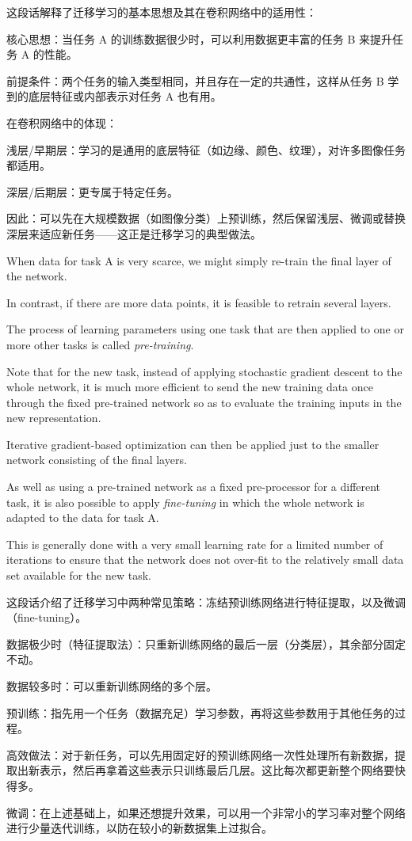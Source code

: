 \documentclass{article}
\begin{document}
{\color{red}
这段话解释了迁移学习的基本思想及其在卷积网络中的适用性：

核心思想：当任务 A 的训练数据很少时，可以利用数据更丰富的任务 B 来提升任务 A 的性能。

前提条件：两个任务的输入类型相同，并且存在一定的共通性，这样从任务 B 学到的底层特征或内部表示对任务 A 也有用。

在卷积网络中的体现：

浅层/早期层：学习的是通用的底层特征（如边缘、颜色、纹理），对许多图像任务都适用。

深层/后期层：更专属于特定任务。

因此：可以先在大规模数据（如图像分类）上预训练，然后保留浅层、微调或替换深层来适应新任务——这正是迁移学习的典型做法。
}

When data for task A is very scarce, we might simply re-train the final layer of the network. 

In contrast, if there are more data points, it is feasible to retrain several layers. 

The process of learning parameters using one task that are then applied to one or more other tasks is called \emph{pre-training}. 

Note that for the new task, instead of applying stochastic gradient descent to the whole network, it is much more efficient to send the new training data once through the fixed pre-trained network so as to evaluate the training inputs in the new representation. 

Iterative gradient-based optimization can then be applied just to the smaller network consisting of the final layers. 

As well as using a pre-trained network as a fixed pre-processor for a different task, it is also possible to apply \emph{fine-tuning} in which the whole network is adapted to the data for task A. 

This is generally done with a very small learning rate for a limited number of iterations to ensure that the network does not over-fit to the relatively small data set available for the new task.

{\color{red}
这段话介绍了迁移学习中两种常见策略：冻结预训练网络进行特征提取，以及微调（fine-tuning）。

数据极少时（特征提取法）：只重新训练网络的最后一层（分类层），其余部分固定不动。

数据较多时：可以重新训练网络的多个层。

预训练：指先用一个任务（数据充足）学习参数，再将这些参数用于其他任务的过程。

高效做法：对于新任务，可以先用固定好的预训练网络一次性处理所有新数据，提取出新表示，然后再拿着这些表示只训练最后几层。这比每次都更新整个网络要快得多。

微调：在上述基础上，如果还想提升效果，可以用一个非常小的学习率对整个网络进行少量迭代训练，以防在较小的新数据集上过拟合。

}
\end{document}
